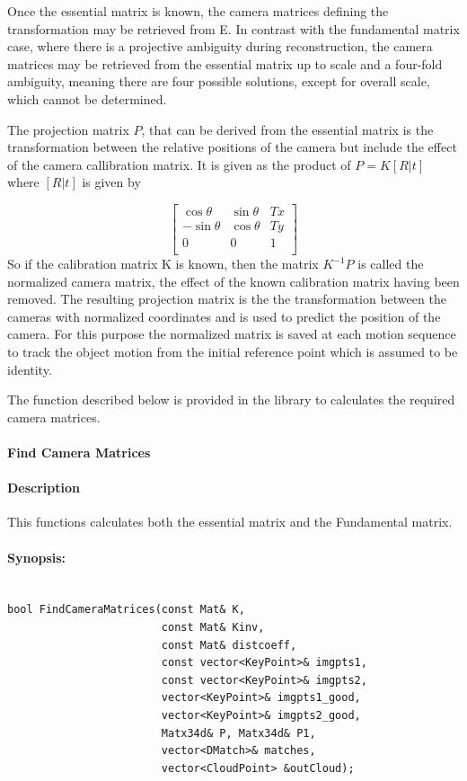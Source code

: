 Once the essential matrix is known, the camera matrices defining the transformation may be retrieved from E. In contrast with the fundamental matrix case, where there is a projective ambiguity during reconstruction, the camera matrices may be retrieved from the essential matrix up to
scale and a four-fold ambiguity, meaning there are four possible solutions, except for
overall scale, which cannot be determined.  

The projection matrix $P$, that can be derived from the essential matrix is the transformation between the relative positions of the camera but include the effect of the camera callibration matrix. It is given as the product of \( P = K [R  |  t] \)
where  \([R  |  t] \) is given by 

	\[\left[ \begin{array}{ccc}
   \cos \theta & \sin \theta & Tx\\
   -\sin \theta & \cos \theta & Ty \\
   0 & 0 & 1 \\
  \end{array} \right]\] 
So if the calibration matrix K is known, then the matrix \(K^{-1} P\) is 
called the normalized camera matrix, the effect of the known calibration matrix having
been removed. The resulting projection matrix is the the transformation between the cameras with normalized coordinates and is used to predict the position of the camera. For this purpose the normalized matrix is saved at each motion sequence to track the object motion from the initial reference point which is assumed to be identity. 

 The function described below is provided in the library to calculates the required camera matrices.

\paragraph{Find Camera Matrices}
\paragraph{Description}
This functions calculates both the essential matrix and the Fundamental matrix.
\pagebreak
\paragraph{Synopsis:}
\begin{lstlisting}

bool FindCameraMatrices(const Mat& K, 
						const Mat& Kinv, 
						const Mat& distcoeff, 
						const vector<KeyPoint>& imgpts1, 
						const vector<KeyPoint>& imgpts2, 
						vector<KeyPoint>& imgpts1_good, 
						vector<KeyPoint>& imgpts2_good, 
						Matx34d& P, Matx34d& P1, 
						vector<DMatch>& matches, 
						vector<CloudPoint> &outCloud); 

 \end{lstlisting}
